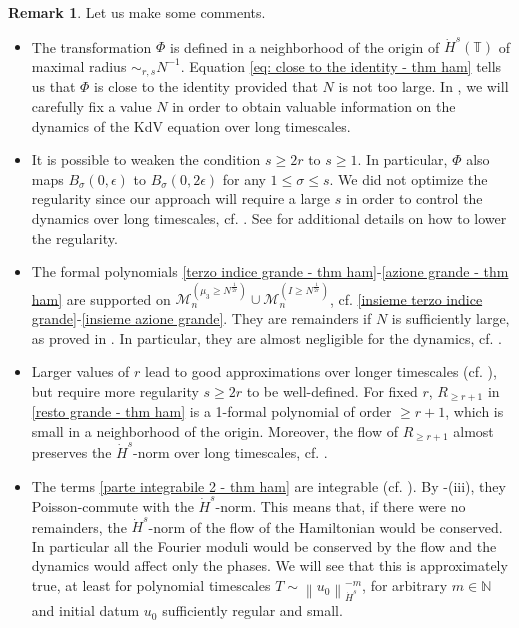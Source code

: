 \documentclass[a4paper,10pt,reqno]{article}
\theoremstyle{definition}
\theoremstyle{plain}
\theoremstyle{plain}
\theoremstyle{definition}
\theoremstyle{plain}
\theoremstyle{plain}
\theoremstyle{plain}
\theoremstyle{definition}
\newtheorem{rem}[definition]{Remark}
\theoremstyle{definition}
\newcommand{\norm}[1]{\left\lVert #1 \right\rVert}
\def \N{\mathbb N}
\def \T{\mathbb{T}}
\def \M{\mathcal{M}}
\begin{document}
\begin{rem}\label{rk: megaremark sotto 210}
Let us make some comments.
\begin{itemize}
    \item The transformation $\Phi$ is defined in a neighborhood of the origin of $\dot{H}^s(\T)$ of maximal radius $\sim_{r,s} N^{-1}$. 
    Equation \eqref{eq: close to the identity - thm ham} tells us that $\Phi$ is close to the identity provided that $N$ is not too large.
    In , we will carefully fix a value $N$ in order to obtain valuable information on the dynamics of the KdV equation over long timescales.
    
    \item It is possible to weaken the condition $s\geq 2r$ to $s\geq 1$. In particular, $\Phi$ also maps $B_{\sigma}(0,\epsilon)$ to $B_{\sigma}(0,2\epsilon)$ for any $1\leq \sigma\leq s$. We did not optimize the regularity since our approach will require a large $s$ in order to control the dynamics over long timescales, cf. .
    See  for additional details on how to lower the regularity. 
    
    \item The formal polynomials \eqref{terzo indice grande - thm ham}-\eqref{azione grande - thm ham} are supported on $\M_n^{(\mu_3 \ge N^{\frac{1}{2r}})} \cup \M_n^{(I \ge N^{\frac{1}{2r}})}$, cf. \eqref{insieme terzo indice grande}-\eqref{insieme azione grande}. 
    They are remainders if $N$ is sufficiently large, as proved in .
    In particular, they are almost negligible for the dynamics, cf. .
    \item Larger values of $r$ lead to good approximations over longer timescales (cf. ), but require more regularity $s\geq 2r$ to be well-defined. 
    For fixed $r$, $R_{\ge r+1}$ in \eqref{resto grande - thm ham} is a 1-formal polynomial of order $\ge r+1$, which is small in a neighborhood of the origin. Moreover, the flow of $R_{\ge r+1}$ almost preserves the $\dot{H}^s$-norm over long timescales, cf. .
    
    \item The terms \eqref{parte integrabile 2 - thm ham} are integrable (cf. ). By -(iii), they Poisson-commute with the $\dot{H}^s$-norm.
    This means that, if there were no remainders, the $\dot{H}^s$-norm of the flow of the Hamiltonian would be conserved.
    In particular all the Fourier moduli would be conserved by the flow and the dynamics would affect only the phases.
    We will see that this is approximately true, at least for polynomial timescales $T \sim \norm{u_0}_{\dot{H}^s}^{-m}$, for arbitrary $m \in \N$ and initial datum $u_0$ sufficiently regular and small.
\end{itemize}
\end{rem}
\end{document}
